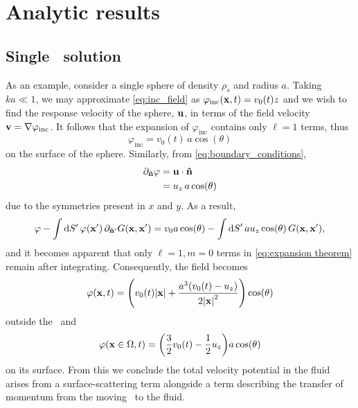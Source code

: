 \section{Analytic results}

\subsection{Single \bubble\ solution}

As an example, consider a single sphere of density $\rho_s$ and radius $a$.
Taking $k a \ll 1$, we may approximate \cref{eq:inc_field} as $\varphi_\text{inc}(\vb{x}, t) = v_0(t) z$ and we wish to find the response velocity of the sphere, $\vb{u}$, in terms of the field velocity $\vb{v} = \nabla \varphi_\text{inc}$. It follows that the expansion of $\varphi_\text{inc}$ contains only $\ell = 1$ terms, thus
\begin{equation}
  \label{eq:uniform field}
  \varphi_\text{inc} = v_0(t) \, a \cos(\theta)
\end{equation}
on the surface of the sphere. Similarly, from \cref{eq:boundary_conditions},
\begin{align}
  \partial_{\vu{n}} \varphi &= \vb{u} \cdot \vu{n} \nonumber \\
                            &= u_z \, a \cos(\theta)
\end{align}
due to the symmetries present in $x$ and $y$.
As a result,
\begin{equation}
    \varphi - \int \dd{S'} \varphi(\vb{x}') \, \partial_{\vu{n}'} G(\vb{x}, \vb{x}') = v_0 a \cos(\theta) - \int \dd{S}' a u_z \cos(\theta) \, G(\vb{x}, \vb{x}'),
\end{equation}
and it becomes apparent that only $\ell = 1, m = 0$ terms in \cref{eq:expansion theorem} remain after integrating.
Consequently, the field becomes
\begin{equation}
  \label{eq:dipole}
  \varphi(\vb{x}, t) = \qty(v_0(t) \abs{\vb{x}} + \frac{a^3\qty(v_0(t) - u_z)}{2\abs{\vb{x}}^2})\cos(\theta)
\end{equation}
outside the \bubble\ and
\begin{equation}
  \varphi(\vb{x} \in \Omega, t) = \qty(\frac{3}{2}v_0(t) - \frac{1}{2} u_z)a \cos(\theta)
\end{equation}
on its surface.
From this we conclude the total velocity potential in the fluid arises from a surface-scattering term alongside a term describing the transfer of momentum from the moving \bubble\ to the fluid.

